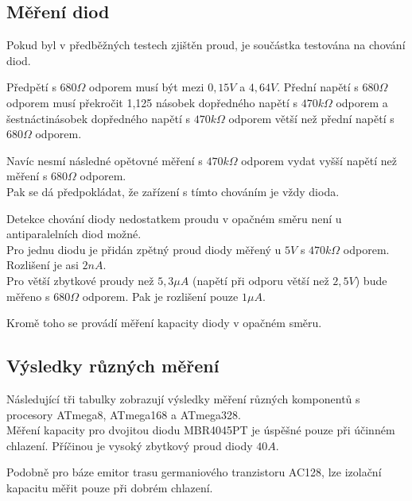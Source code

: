 \subsection{Měření diod}
\label{sec:diode}
Pokud byl v předběžných testech zjištěn proud, je součástka testována na chování diod.

Předpětí s \(680\Omega\) odporem musí být mezi \(0,15V\) a \(4,64V\).
Přední napětí s \(680\Omega\) odporem musí překročit 1,125 násobek dopředného napětí
s \(470k\Omega\) odporem a šestnáctinásobek dopředného napětí s \(470k\Omega\) odporem větší než přední napětí s \(680\Omega\) odporem.

Navíc nesmí následné opětovné měření s \(470k\Omega\) odporem vydat vyšší napětí než měření s \(680\Omega\) odporem.\\
Pak se dá předpokládat, že zařízení s tímto chováním je vždy dioda.

Detekce chování diody nedostatkem proudu v opačném směru není u antiparalelních diod možné.\\
Pro jednu diodu je přidán zpětný proud diody měřený u \(5V\) s \(470k\Omega\) odporem. Rozlišení je asi \(2nA\).
\\Pro větší zbytkové proudy než \(5,3\mu A\) (napětí při odporu větší než \(2,5V\)) bude měřeno s \(680\Omega\) odporem.
Pak je rozlišení pouze \(1\mu A\).

Kromě toho se provádí měření kapacity diody v opačném směru. 

\subsection{Výsledky různých měření}
Následující tři tabulky zobrazují výsledky měření různých komponentů s procesory ATmega8, ATmega168 a ATmega328.\\
Měření kapacity pro dvojitou diodu MBR4045PT je úspěšné pouze při účinném chlazení. Příčinou je vysoký zbytkový proud diody \(40A\).

Podobně pro báze emitor trasu germaniového tranzistoru AC128, lze izolační kapacitu měřit pouze při dobrém chlazení. 


